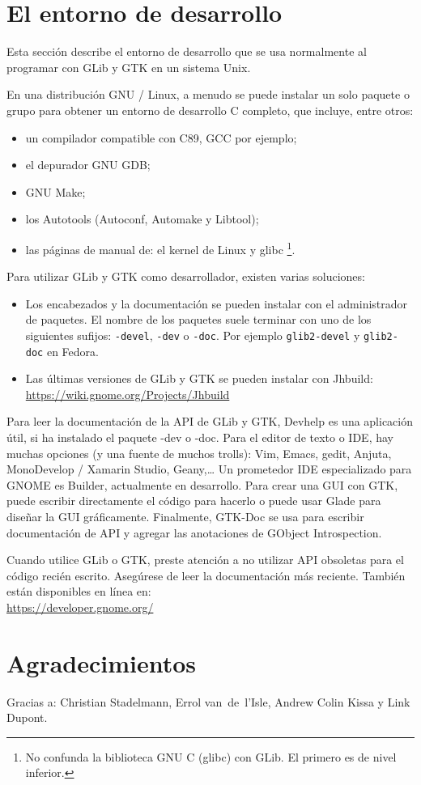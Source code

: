 \section{El entorno de desarrollo}
\label{intro-dev-environment}

Esta sección describe el entorno de desarrollo que se usa normalmente al programar con GLib y GTK en un sistema Unix.

En una distribución GNU / Linux, a menudo se puede instalar un solo paquete o grupo para obtener un entorno de desarrollo C completo, que incluye, entre otros:
\begin{itemize}
    \item un compilador compatible con C89, GCC por ejemplo;
    \item el depurador GNU GDB;
    \item GNU Make;
    \item los Autotools (Autoconf, Automake y Libtool);
    \item las páginas de manual de: el kernel de Linux y glibc \footnote{No confunda la biblioteca GNU C (glibc) con GLib. El primero es de nivel inferior.}.
\end{itemize}

Para utilizar GLib y GTK como desarrollador, existen varias soluciones:
\begin{itemize}
    \item Los encabezados y la documentación se pueden instalar con el administrador de paquetes. El nombre de los paquetes suele terminar con uno de los siguientes sufijos: \texttt{-devel}, \texttt{-dev} o \texttt{-doc}. Por ejemplo \texttt{glib2-devel} y \texttt{glib2-doc} en Fedora.
    \item Las últimas versiones de GLib y GTK se pueden instalar con Jhbuild:\\
    \url{https://wiki.gnome.org/Projects/Jhbuild}
\end{itemize}

Para leer la documentación de la API de GLib y GTK, Devhelp es una aplicación útil, si ha instalado el paquete -dev o -doc. Para el editor de texto o IDE, hay muchas opciones (y una fuente de muchos trolls): Vim, Emacs, gedit, Anjuta, MonoDevelop / Xamarin Studio, Geany,… Un prometedor IDE especializado para GNOME es Builder, actualmente en desarrollo. Para crear una GUI con GTK, puede escribir directamente el código para hacerlo o puede usar Glade para diseñar la GUI gráficamente. Finalmente, GTK-Doc se usa para escribir documentación de API y agregar las anotaciones de GObject Introspection.

Cuando utilice GLib o GTK, preste atención a no utilizar API obsoletas para el código recién escrito. Asegúrese de leer la documentación más reciente. También están disponibles en línea en:\\
\url{https://developer.gnome.org/}

\section{Agradecimientos}
Gracias a: Christian Stadelmann, Errol van~de~l'Isle, Andrew Colin Kissa y Link Dupont.
